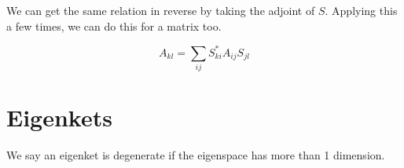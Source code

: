 \documentclass[12pt]{article}
\begin{document}
We can get the same relation in reverse by taking the adjoint of $S$. Applying this a few times, we can do this for a matrix too.

$$A_{kl} = \sum_{ij} S^*_{ki} A_{ij} S_{jl}$$

\section{Eigenkets}

\begin{defn}[Degeneracy]
    We say an eigenket is degenerate if the eigenspace has more than 1 dimension.
\end{defn}
\end{document}
